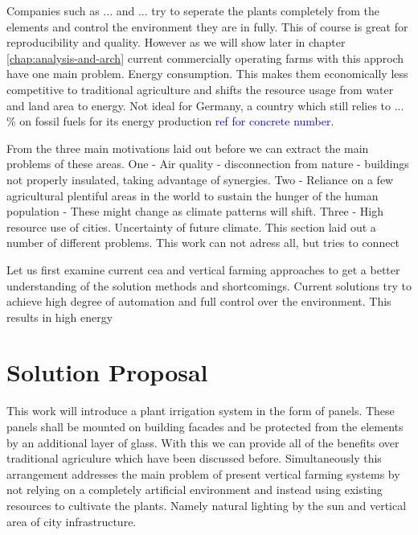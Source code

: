 Companies such as ... and ... try to seperate the plants completely from the elements and control the environment they are in fully.
This of course is great for reproducibility and quality.
However as we will show later in chapter \ref{chap:analysis-and-arch} current commercially operating farms with this approch have one main problem.
Energy consumption.
This makes them economically less competitive to traditional agriculture and shifts the resource usage from water and land area to energy.
Not ideal for Germany, a country which still relies to ... \% on fossil fuels for its energy production \textcolor{blue}{ref for concrete number}.

From the three main motivations laid out before we can extract the main problems of these areas.
One - Air quality - disconnection from nature - buildings not properly insulated, taking advantage of synergies. 
Two - Reliance on a few agricultural plentiful areas in the world to sustain the hunger of the human population - These might change as climate patterns will shift.
Three - 
High resource use of cities.
Uncertainty of future climate.
This section laid out a number of different problems. This work can not adress all, but tries to connect 

Let us first examine current \ac{cea} and vertical farming approaches to get a better understanding of the solution methods and shortcomings.
Current solutions try to achieve high degree of automation and full control over the environment.
This results in high energy



\section{Solution Proposal}
This work will introduce a plant irrigation system in the form of panels.
These panels shall be mounted on building facades and be protected from the elements by an additional layer of glass.
With this we can provide all of the benefits over traditional agriculure which have been discussed before.
Simultaneously this arrangement addresses the main problem of present vertical farming systems by not relying on a completely artificial environment and instead using existing resources to cultivate the plants.
Namely natural lighting by the sun and vertical area of city infrastructure.

